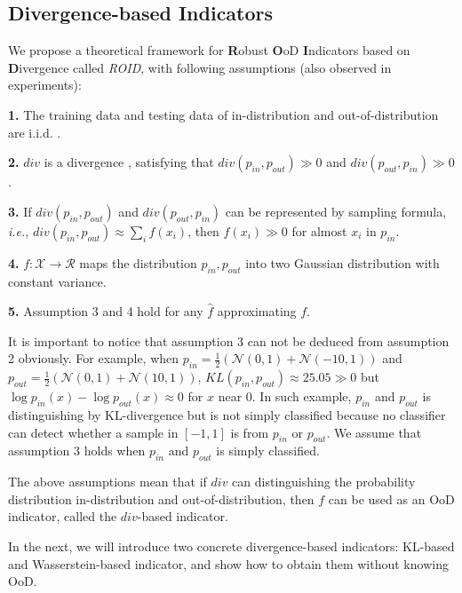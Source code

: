 \documentclass[letterpaper]{article} %
\newcommand{\IE}{\textit{i.e.}, }
\newcommand{\EG}{\textit{e.g.}, }
\newcommand{\ROID}{\textit{ROID}}
\newcommand{\pin}{p_{in}}
\newcommand{\pout}{p_{out}}
\begin{document}
\subsection{Divergence-based Indicators}
We propose a theoretical framework for \textbf{R}obust \textbf{O}oD \textbf{I}ndicators based on \textbf{D}ivergence called \ROID{}, with following assumptions (also observed in experiments):

\noindent \textbf{1.} The training data and testing data of in-distribution and out-of-distribution are i.i.d. .

\noindent \textbf{2.}  $div$ is a divergence , satisfying that $div(\pin, \pout) \gg 0$ and $div(\pout, \pin) \gg 0$. 

\noindent \textbf{3.}  If $div(\pin, \pout)$ and $div(\pout, \pin)$ can be represented by sampling formula, \IE $div(\pin, \pout) \approx \sum_{i} f(x_i)$, then $f(x_i) \gg 0$ for almost $x_i$ in $\pin$. 

\noindent \textbf{4.} $f: \mathcal{X} \rightarrow \mathcal{R}$ maps the distribution $\pin, \pout$ into two Gaussian distribution with constant variance. 

\noindent \textbf{5.} Assumption 3 and 4 hold for any $\hat{f}$ approximating $f$. 


It is important to notice that assumption 3 can not be deduced from assumption 2 obviously. For example, when $\pin = \frac{1}{2}(\mathcal{N}(0, 1) + \mathcal{N}(-10, 1))$ and $\pout = \frac{1}{2}(\mathcal{N}(0, 1) + \mathcal{N}(10, 1))$, $KL(\pin, \pout) \approx 25.05 \gg 0$ but $\log \pin(x) - \log \pout(x) \approx 0$ for $x$ near 0.  In such example, $\pin$ and $\pout$ is distinguishing by KL-divergence but is not simply classified because no classifier can detect whether a sample in $[-1, 1]$ is from $\pin$ or $\pout$. We assume that assumption 3 holds when $\pin$ and $\pout$ is simply classified. 

The above assumptions mean that if $div$ can distinguishing the probability distribution                                                                                                        in-distribution and out-of-distribution, then $f$ can be used as an OoD indicator, called the $div$-based indicator. 

In the next, we will introduce two concrete divergence-based indicators: KL-based and Wasserstein-based indicator, and show how to obtain them without knowing OoD. 
\end{document}
